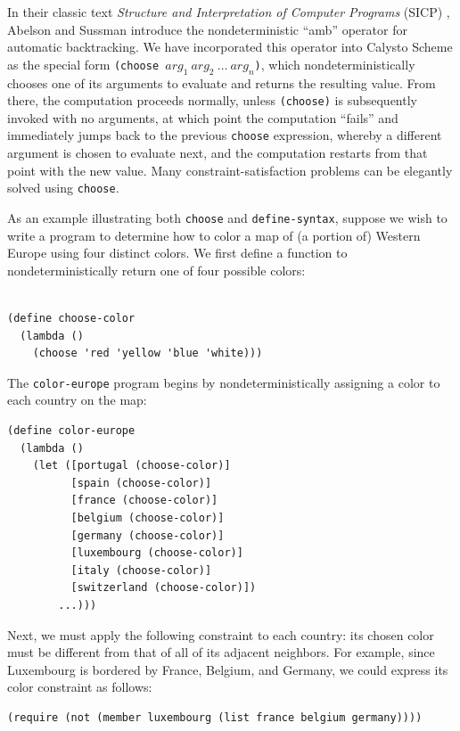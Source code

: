 \documentclass[acmsmall,screen,anonymous,review]{acmart}
\begin{document}
\noindent
In their classic text \emph{Structure and Interpretation of Computer Programs}
(SICP) \cite{SICP}, Abelson and Sussman introduce the nondeterministic ``amb''
operator for automatic backtracking.  We have incorporated this operator into
Calysto Scheme as the special form
\texttt{(choose~$\mathit{arg}_1~\mathit{arg}_2~\ldots~\mathit{arg}_n$)}, which
nondeterministically chooses one of its arguments to evaluate and returns the
resulting value.  From there, the computation proceeds normally, unless
\texttt{(choose)} is subsequently invoked with no arguments, at which point the
computation ``fails'' and immediately jumps back to the previous
\texttt{choose} expression, whereby a different argument is chosen to evaluate
next, and the computation restarts from that point with the new value.  Many
constraint-satisfaction problems can be elegantly solved using \texttt{choose}.

As an example illustrating both \texttt{choose} and
\texttt{define-syntax}, suppose we wish to write a program to determine how to
color a map of (a portion of) Western Europe using four distinct colors.  We
first define a function to nondeterministically return one of four possible
colors:\\\\

{\small
\begin{verbatim}
(define choose-color
  (lambda ()
    (choose 'red 'yellow 'blue 'white)))
\end{verbatim}
}

\noindent
The \texttt{color-europe} program begins by nondeterministically assigning a
color to each country on the map:

{\small
\begin{verbatim}
(define color-europe
  (lambda ()
    (let ([portugal (choose-color)]
          [spain (choose-color)]
          [france (choose-color)]
          [belgium (choose-color)]
          [germany (choose-color)]
          [luxembourg (choose-color)]
          [italy (choose-color)]
          [switzerland (choose-color)])
        ...)))
\end{verbatim}
}

\noindent
Next, we must apply the following constraint to each country: its chosen color
must be different from that of all of its adjacent neighbors.  For example,
since Luxembourg is bordered by France, Belgium, and Germany, we could express
its color constraint as follows:

{\small
\begin{verbatim}
(require (not (member luxembourg (list france belgium germany))))
\end{verbatim}
}
\end{document}
